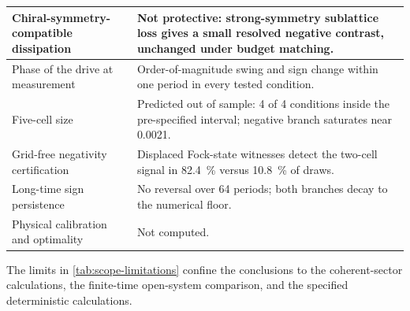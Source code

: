 \documentclass[aps,pra,preprint,superscriptaddress,amsmath,amssymb]{revtex4-2}
\begin{document}
\begin{table}[!htbp]
\begin{tabularx}{\linewidth}{lX}
Chiral-symmetry-compatible dissipation & Not protective: strong-symmetry sublattice loss gives a small resolved negative contrast, unchanged under budget matching. \\\hline
Phase of the drive at measurement & Order-of-magnitude swing and sign change within one period in every tested condition. \\\hline
Five-cell size & Predicted out of sample: \num{4} of \num{4} conditions inside the pre-specified interval; negative branch saturates near \num{0.0021}. \\\hline
Grid-free negativity certification & Displaced Fock-state witnesses detect the two-cell signal in \qty{82.4}{\percent} versus \qty{10.8}{\percent} of draws. \\\hline
Long-time sign persistence & No reversal over \num{64} periods; both branches decay to the numerical floor. \\\hline
Physical calibration and optimality & Not computed. \\
\end{tabularx}
\end{table}

The limits in \cref{tab:scope-limitations} confine the conclusions to the coherent-sector calculations, the finite-time open-system comparison, and the specified deterministic calculations.



\end{document}
